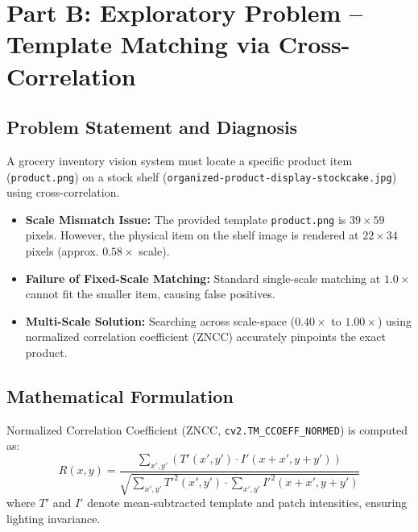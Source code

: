 \documentclass[12pt]{article}
\begin{document}
\section{Part B: Exploratory Problem -- Template Matching via Cross-Correlation}

\subsection{Problem Statement and Diagnosis}
A grocery inventory vision system must locate a specific product item (\texttt{product.png}) on a stock shelf (\texttt{organized-product-display-stockcake.jpg}) using cross-correlation.
\begin{itemize}
    \item \textbf{Scale Mismatch Issue:} The provided template \texttt{product.png} is $39 \times 59$ pixels. However, the physical item on the shelf image is rendered at $22 \times 34$ pixels (approx. $0.58\times$ scale).
    \item \textbf{Failure of Fixed-Scale Matching:} Standard single-scale matching at $1.0\times$ cannot fit the smaller item, causing false positives.
    \item \textbf{Multi-Scale Solution:} Searching across scale-space ($0.40\times$ to $1.00\times$) using normalized correlation coefficient (ZNCC) accurately pinpoints the exact product.
\end{itemize}

\subsection{Mathematical Formulation}
Normalized Correlation Coefficient (ZNCC, \texttt{cv2.TM\_CCOEFF\_NORMED}) is computed as:
\begin{equation}
    R(x, y) = \frac{\sum_{x', y'} (T'(x', y') \cdot I'(x+x', y+y'))}{\sqrt{\sum_{x', y'} T'^2(x', y') \cdot \sum_{x', y'} I'^2(x+x', y+y')}}
\end{equation}
where $T'$ and $I'$ denote mean-subtracted template and patch intensities, ensuring lighting invariance.
\end{document}
